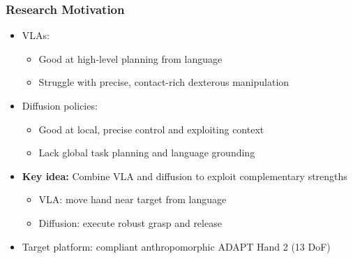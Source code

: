 \documentclass{beamer}
\begin{document}
\begin{frame}
  \frametitle{Research Motivation}
  \small
  \begin{itemize}
    \item VLAs:
      \begin{itemize}
        \item Good at high-level planning from language
        \item Struggle with precise, contact-rich dexterous manipulation
      \end{itemize}
    \item Diffusion policies:
      \begin{itemize}
        \item Good at local, precise control and exploiting context
        \item Lack global task planning and language grounding
      \end{itemize}
    \item \textbf{Key idea:} Combine VLA and diffusion to exploit complementary strengths
      \begin{itemize}
        \item VLA: move hand near target from language
        \item Diffusion: execute robust grasp and release
      \end{itemize}
    \item Target platform: compliant anthropomorphic ADAPT Hand 2 (13 DoF)
  \end{itemize}
\end{frame}
\end{document}
